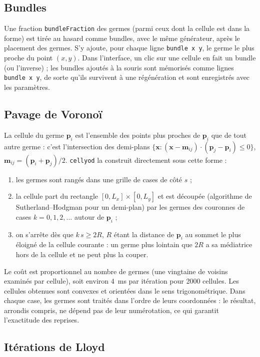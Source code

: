 \documentclass[10pt,a4paper]{article}
\newcommand{\code}[1]{\texttt{#1}}
\newcommand{\cy}{\code{cellyod}}
\newcommand{\vect}[1]{\boldsymbol{#1}}
\begin{document}
\subsection{Bundles}

Une fraction \code{bundleFraction} des germes (parmi ceux dont la cellule est dans la forme) est tirée au hasard
comme bundles, avec le même générateur, après le placement des germes. S'y ajoute, pour chaque ligne
\code{bundle x y}, le germe le plus proche du point $(x,y)$. Dans l'interface, un clic sur une cellule en fait un
bundle (ou l'inverse) ; les bundles ajoutés à la souris sont mémorisés comme lignes \code{bundle x y}, de sorte
qu'ils survivent à une régénération et sont enregistrés avec les paramètres.

\subsection{Pavage de Voronoï}\label{sec:voronoi}

La cellule du germe $\vect p_i$ est l'ensemble des points plus proches de $\vect p_i$ que de tout autre germe :
c'est l'intersection des demi-plans $\{\vect x : (\vect x-\vect m_{ij})\cdot(\vect p_j-\vect p_i)\le 0\}$,
$\vect m_{ij}=(\vect p_i+\vect p_j)/2$. \cy{} la construit directement sous cette forme :
\begin{enumerate}
  \item les germes sont rangés dans une grille de cases de côté $s$ ;
  \item la cellule part du rectangle $[0,L_x]\times[0,L_y]$ et est découpée (algorithme de Sutherland--Hodgman
    pour un demi-plan) par les germes des couronnes de cases $k=0,1,2,\dots$ autour de $\vect p_i$ ;
  \item on s'arrête dès que $k\,s\ge 2R$, $R$ étant la distance de $\vect p_i$ au sommet le plus éloigné de la
    cellule courante : un germe plus lointain que $2R$ a sa médiatrice hors de la cellule et ne peut plus la
    couper.
\end{enumerate}
Le coût est proportionnel au nombre de germes (une vingtaine de voisins examinés par cellule), soit environ
4~ms par itération pour 2000 cellules. Les cellules obtenues sont convexes et orientées dans le sens
trigonométrique. Dans chaque case, les germes sont traités dans l'ordre de leurs coordonnées : le résultat,
arrondis compris, ne dépend pas de leur numérotation, ce qui garantit l'exactitude des reprises.

\subsection{Itérations de Lloyd}\label{sec:lloyd}
\end{document}
